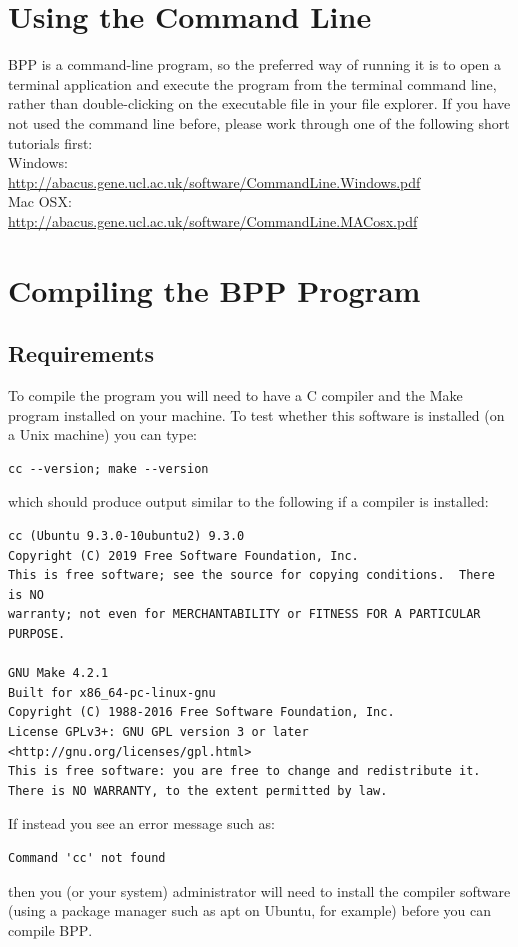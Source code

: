 \documentclass{book}
\numberwithin{equation}{section} \renewcommand{\baselinestretch}{0.55}
\begin{document}
\section{Using the Command Line}\label{commandline}
\textsc{BPP} is a command-line program, so the preferred way of
running it is to open a terminal application and execute the program
from the terminal command line, rather than double-clicking on the
executable file in your file explorer.  If you have not used the
command line before, please work through one of the following short
tutorials first:
\newline \noindent \vspace{0.1pt} \\
Windows: \vspace{0.1pt} \\
\href{http://abacus.gene.ucl.ac.uk/software/CommandLine.Windows.pdf}{http://abacus.gene.ucl.ac.uk/software/CommandLine.Windows.pdf}
\newline \noindent \vspace{0.1pt} \\
Mac OSX: \vspace{0.1pt} \\
\href{http://abacus.gene.ucl.ac.uk/software/CommandLine.MACosx.pdf}{http://abacus.gene.ucl.ac.uk/software/CommandLine.MACosx.pdf} \\

\section{Compiling the BPP Program}\label{compiling}
\subsection{Requirements}
To compile the program you will need to have a C compiler and the Make
program installed on your machine.  To test whether this software is
installed (on a Unix machine) you can type:
{\color{red}
\begin{verbatim}
cc --version; make --version
\end{verbatim}
}
\noindent
which should produce output similar to the following if a compiler
is installed:
{\small
\begin{verbatim}
cc (Ubuntu 9.3.0-10ubuntu2) 9.3.0
Copyright (C) 2019 Free Software Foundation, Inc.
This is free software; see the source for copying conditions.  There is NO
warranty; not even for MERCHANTABILITY or FITNESS FOR A PARTICULAR PURPOSE.

GNU Make 4.2.1
Built for x86_64-pc-linux-gnu
Copyright (C) 1988-2016 Free Software Foundation, Inc.
License GPLv3+: GNU GPL version 3 or later <http://gnu.org/licenses/gpl.html>
This is free software: you are free to change and redistribute it.
There is NO WARRANTY, to the extent permitted by law.
\end{verbatim}
  If instead you see an error message such as:
\begin{verbatim}
Command 'cc' not found
\end{verbatim}
}
\noindent
then you (or your system) administrator will need to install the
compiler software (using a package manager such as apt on Ubuntu,
for example) before you can compile \textsc{BPP}.
\end{document}
